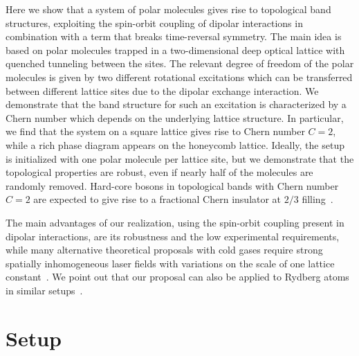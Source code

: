 Here we show that a system of polar molecules gives rise to topological band structures, exploiting the spin-orbit coupling of dipolar interactions in combination with a term that breaks time-reversal symmetry.
The main idea is based on polar molecules trapped in a two-dimensional deep optical lattice with quenched tunneling between the sites.
The relevant degree of freedom of the polar molecules is given by two different rotational excitations which can be transferred between different lattice sites due to the dipolar exchange interaction.
We demonstrate that the band structure for such an excitation is characterized by a Chern number which depends on the underlying lattice structure.
In particular, we find that the system on a square lattice gives rise to Chern number $C=2$, while a rich phase diagram appears on the honeycomb lattice. %
Ideally, the setup is initialized with one polar molecule per lattice site, but we demonstrate that the topological properties are robust, even if nearly half of the molecules are randomly removed.
Hard-core bosons in topological bands with Chern number $C=2$ are expected to give rise to a fractional Chern insulator at $2/3$ filling~\cite{Moller2009,Wang2012a}.

The main advantages of our realization, using the spin-orbit coupling present in dipolar interactions, are its robustness and the low experimental requirements, while many alternative theoretical proposals with cold gases require strong spatially inhomogeneous laser fields with variations on the scale of one lattice constant~\cite{Liu2010,Stanescu2010,Goldman2013,Li2008,Yao2012,Yao2013,Goldman2013,Jaksch2003a}.
We point out that our proposal can also be applied to Rydberg atoms in similar setups~\cite{Barredo2014,Piotrowicz2013,Nogrette2014}.

\section{Setup}


